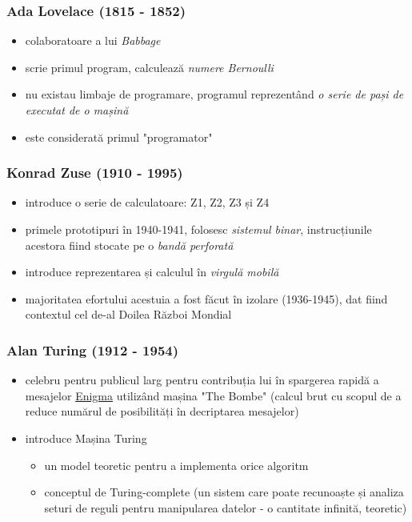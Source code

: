 \documentclass[a4paper,10pt]{article}
\begin{document}
\begin{multicols}{2}
\subsubsection{Ada Lovelace (1815 - 1852)}
\begin{itemize}
    \item colaboratoare a lui \textit{Babbage}
    \item scrie primul program, calculează \textit{numere Bernoulli}
    \item nu existau limbaje de programare, programul reprezentând \textit{o serie de pași de executat de o mașină}
    \item este considerată primul "programator"
\end{itemize}
\subsubsection{Konrad Zuse (1910 - 1995)}
\begin{itemize}
    \item introduce o serie de calculatoare: Z1, Z2, Z3 și Z4
    \item primele prototipuri în 1940-1941, folosesc \textit{sistemul binar}, instrucțiunile acestora fiind stocate pe o \textit{bandă perforată}
    \item introduce reprezentarea și calculul în \textit{virgulă mobilă}
    \item majoritatea efortului acestuia a fost făcut în izolare (1936-1945), dat fiind contextul cel de-al Doilea Război Mondial
\end{itemize}
\subsubsection{Alan Turing (1912 - 1954)}
\begin{itemize}
    \item celebru pentru publicul larg pentru contribuția lui în spargerea rapidă a mesajelor \href{https://en.wikipedia.org/wiki/Cryptanalysis_of_the_Enigma}{Enigma} utilizând mașina "The Bombe" (calcul brut cu scopul de a reduce numărul de posibilități în decriptarea mesajelor)
    \item introduce Mașina Turing
    \begin{itemize}
        \item un model teoretic pentru a implementa orice algoritm
        \item conceptul de Turing-complete (un sistem care poate recunoaște și analiza seturi de reguli pentru manipularea datelor - o cantitate infinită, teoretic)
    \end{itemize}
\end{itemize}
\end{multicols}
\end{document}
